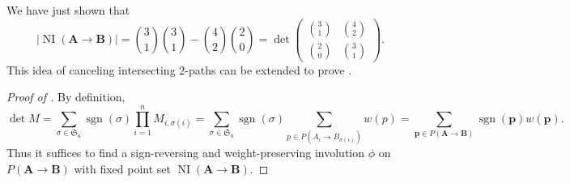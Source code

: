 \documentclass[oneside]{book}
\numberwithin{equation}{section}
\theoremstyle{definition}
\newcommand\NI{\operatorname{NI}}
\newcommand\sgn{\operatorname{sgn}}
\newcommand\sym{\mathfrak{S}}
\renewcommand\vec[1]{\mathbf{#1}}
\begin{document}
We have just shown that
\[
  |\NI(\vec A\to \vec B)|  =
  \binom{3}{1}\binom{3}{1} - \binom{4}{2} \binom{2}{0}
=     \det \begin{pmatrix}
\binom{3}{1} & \binom{4}{2}\\[4pt]
\binom{2}{0} & \binom{3}{1}
           \end{pmatrix}.
\]
This idea of canceling intersecting \( 2 \)-paths can be extended to
prove .

\begin{proof}[Proof of ]
  By definition,
\[
  \det M = \sum_{\sigma\in \sym_n} \sgn(\sigma) \prod_{i=1}^{n} M_{i,\sigma(i)}
  = \sum_{\sigma\in \sym_n} \sgn(\sigma) \sum_{p\in P(A_i\to B_{\sigma(i)})} w(p)
  = \sum_{\vec p \in P(\vec A\to \vec B)} \sgn(\vec p) w(\vec p).
\]
Thus it suffices to find a sign-reversing and weight-preserving
involution \( \phi \) on \( P(\vec A\to \vec B) \) with fixed point
set \( \NI(\vec A\to \vec B) \).


\end{proof}
\end{document}
